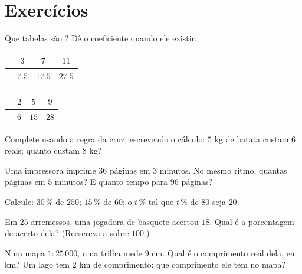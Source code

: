 \section{Exercícios}

\begin{exercise}[$\star$]\label{exo:g7:prop:1}
Que tabelas são ? Dê o coeficiente quando
ele existir.
\begin{center}
\renewcommand{\arraystretch}{1.2}
\begin{tabular}{l|ccc}
 & $3$ & $7$ & $11$ \\
\hline
 & $7.5$ & $17.5$ & $27.5$ \\
\end{tabular}
\qquad
\begin{tabular}{l|ccc}
 & $2$ & $5$ & $9$ \\
\hline
 & $6$ & $15$ & $28$ \\
\end{tabular}
\end{center}
\end{exercise}

\begin{exercise}[$\star$]\label{exo:g7:prop:2}
Complete usando a regra da cruz, escrevendo o cálculo: $5$ kg de batata
custam $6$ reais; quanto custam $8$ kg?
\end{exercise}

\begin{exercise}[$\star$]\label{exo:g7:prop:3}
Uma impressora imprime $36$ páginas em $3$ minutos. No mesmo ritmo,
quantas páginas em $5$ minutos? E quanto tempo para $96$ páginas?
\end{exercise}

\begin{exercise}[$\star$]\label{exo:g7:prop:4}
Calcule: $30\,\%$ de $250$; \quad $15\,\%$ de $60$; \quad o $t\,\%$
tal que $t\,\%$ de $80$ seja $20$.
\end{exercise}

\begin{exercise}[$\star$]\label{exo:g7:prop:5}
Em $25$ arremessos, uma jogadora de basquete acertou $18$. Qual é a
porcentagem de acerto dela? (Reescreva a  sobre $100$.)
\end{exercise}

\begin{exercise}[$\star$]\label{exo:g7:prop:6}
Num mapa $1 : 25\,000$, uma trilha mede $9$ cm. Qual é o comprimento
real dela, em km? Um lago tem $2$ km de comprimento: que comprimento
ele tem no mapa?
\end{exercise}

